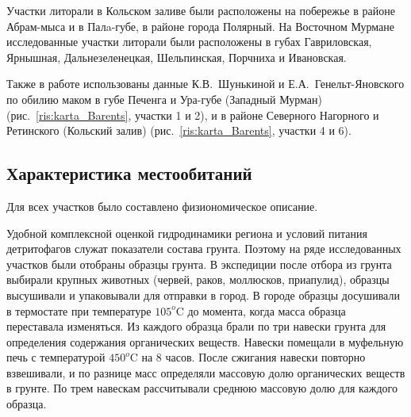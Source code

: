 Участки литорали  в   Кольском   заливе   были  расположены на побережье в районе Абрам-мыса и в Палa-губе, в районе города Полярный. 
На   Восточном   Мурмане исследованные участки литорали  были   расположены   в   губах   Гавриловская,  Ярнышная, Дальнезеленецкая, Шельпинская, Порчниха и Ивановская.

Также в работе использованы данные К.\:В.~Шунькиной и Е.\:А.~Генельт-Яновского по обилию маком в губе Печенга и Ура-губе (Западный Мурман) (рис.~\ref{ris:karta_Barents}, участки 1 и 2), и в районе Северного Нагорного и Ретинского (Кольский залив) (рис.~\ref{ris:karta_Barents}, участки 4 и 6).

\afterpage{\clearpage}

    \subsection{Характеристика местообитаний}
Для всех участков было составлено физиономическое описание.

Удобной комплексной оценкой гидродинамики региона и условий питания детритофагов служат показатели состава грунта. 
Поэтому на ряде исследованных участков были отобраны образцы грунта. 
В экспедиции после отбора из грунта выбирали крупных животных (червей, раков, моллюсков, приапулид), образцы высушивали и упаковывали для отправки в город. 
В городе образцы досушивали в термостате при температуре $105^o$C до момента, когда масса образца переставала изменяться. 
Из каждого образца брали по три навески грунта для определения содержания органических веществ. 
Навески помещали в муфельную печь с температурой $450^o$C на $8$ часов. 
После сжигания навески повторно взвешивали, и по разнице масс определяли массовую долю органических веществ в грунте. 
По трем навескам рассчитывали среднюю массовую долю для каждого образца.

